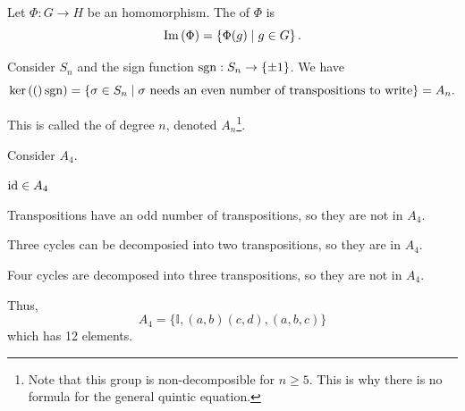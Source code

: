 


        

\begin{definition}
    Let $\Phi: G \to H$ be an homomorphism. The  of $\Phi$ is \[
        \mathrm{Im}\left( \Phi \right) = \left\{ \Phi(g) \mid g \in G \right\}.
    \]
\end{definition}


\begin{example}
    Consider $S_n$ and the sign function $\mathrm{sgn}: S_n \to \{\pm 1\}$. We have \[
        \mathrm{ker}\left( ( \right)\mathrm{sgn}) = \left\{ \sigma \in S_n \mid \sigma \text{ needs an even number of transpositions to write} \right\} = A_n.
    \]

    This is called the  of degree $n$, denoted $A_n$\footnote{Note that this group is non-decomposible for $n \geq 5$. This is why there is no formula for the general quintic equation.}.
\end{example}

\begin{example}
    Consider $A_4$. 

    \begin{listu}
        \item $\mathrm{id} \in A_4$
        \item Transpositions have an odd number of transpositions, so they are not in $A_4$.
        \item Three cycles can be decomposied into two transpositions, so they are in $A_4$.
        \item Four cycles are decomposed into three transpositions, so they are not in $A_4$.
    \end{listu}

    Thus, \[
        A_4 = \{ \mathbb{I}, (a, b)(c, d), (a, b, c) \}
    \] which has 12 elements. 
\end{example}

